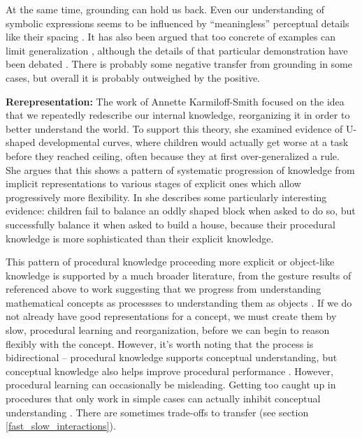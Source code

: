 \documentclass[11pt]{article}
\begin{document}
At the same time, grounding can hold us back. Even our understanding of symbolic expressions seems to be influenced by ``meaningless'' perceptual details like their spacing \citep{Landy2007}. It has also been argued that too concrete of examples can limit generalization \citep{Kaminski2008}, although the details of that particular demonstration have been debated \citep{DeBock2011, Lampinen2017b}. There is probably some negative transfer from grounding in some cases, but overall it is probably outweighed by the positive. \par
\textbf{Rerepresentation:} The work of Annette Karmiloff-Smith \citep[e.g.]{Karmiloff-Smith1986, Karmiloff-Smith1992, Clark1993} focused on the idea that we repeatedly redescribe our internal knowledge, reorganizing it in order to better understand the world. To support this theory, she examined evidence of U-shaped developmental curves, where children would actually get worse at a task before they reached ceiling, often because they at first over-generalized a rule. She argues that this shows a pattern of systematic progression of knowledge from implicit representations to various stages of explicit ones which allow progressively more flexibility. In \citet{Karmiloff-Smith1986} she describes some particularly interesting evidence: children fail to balance an oddly shaped block when asked to do so, but successfully balance it when asked to build a house, because their procedural knowledge is more sophisticated than their explicit knowledge. \par 
This pattern of procedural knowledge proceeding more explicit or object-like knowledge is supported by a much broader literature, from the gesture results of \citet{Goldin-Meadow1993} referenced above to work suggesting that we progress from understanding mathematical concepts as processses to understanding them as objects \citep{Dubinsky1991, Hazzan1999}. If we do not already have good representations for a concept, we must create them by slow, procedural learning and reorganization, before we can begin to reason flexibly with the concept. However, it's worth noting that the process is bidirectional -- procedural knowledge supports conceptual understanding, but conceptual knowledge also helps improve procedural performance \citep{Rittle-Johnson2001}. However, procedural learning can occasionally be misleading. Getting too caught up in procedures that only work in simple cases can actually inhibit conceptual understanding \citep{McNeil2005}. There are sometimes trade-offs to transfer (see section \ref{fast_slow_interactions}). \par 
\end{document}
